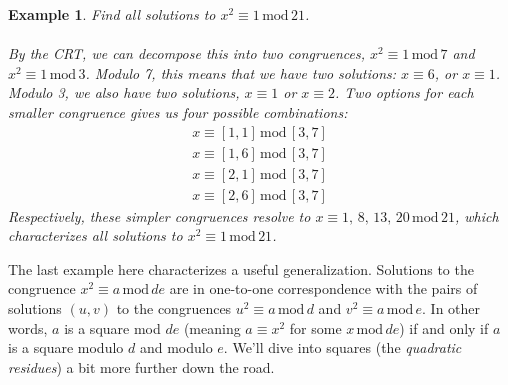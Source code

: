\documentclass{article}
\newtheorem{example}{Example}
\newcommand{\X}[1]{\, \text{mod} \, #1}
\begin{document}
\begin{mdframed} 
\begin{example} 
Find all solutions to $x^2\equiv 1\X{21}$. \\\\
By the CRT, we can decompose this into two congruences, $x^2\equiv 1\X{7}$ and $x^2\equiv1\X{3}$. Modulo 7, this means that we have two solutions: $x\equiv 6$, or $x\equiv 1$. Modulo 3, we also have two solutions, $x\equiv 1$ or $x\equiv 2$. Two options for each smaller congruence gives us four possible combinations: 
\begin{align*} 
x\equiv [1, 1]\X{[3, 7]}\\
x\equiv [1, 6]\X{[3, 7]}\\
x\equiv [2, 1]\X{[3, 7]}\\
x\equiv [2, 6]\X{[3, 7]}
\end{align*} 
Respectively, these simpler congruences resolve to $x\equiv 1,\, 8,\, 13,\, 20\X{21}$, which characterizes all solutions to $x^2\equiv 1\X{21}$.  
\end{example} 
\end{mdframed} 
The last example here characterizes a useful generalization. Solutions to the congruence $x^2\equiv a\X{de}$ are in one-to-one correspondence with the pairs of solutions $(u, v)$ to the congruences $u^2\equiv a\X{d}$ and $v^2\equiv a\X{e}$. In other words, $a$ is a square mod $de$ (meaning $a\equiv x^2$ for some $x\X{de}$) if and only if $a$ is a square modulo $d$ and modulo $e$. We'll dive into squares (the \textit{quadratic residues}) a bit more further down the road. 
\end{document}
